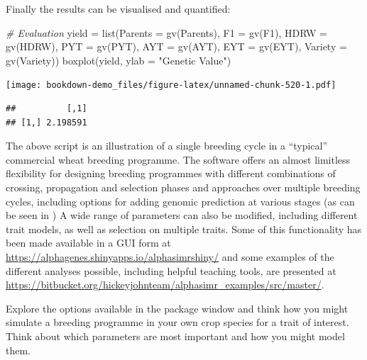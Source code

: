 \documentclass[
]{book}
\newenvironment{Shaded}{\begin{snugshade}}{\end{snugshade}}
\newcommand{\AttributeTok}[1]{\textcolor[rgb]{0.77,0.63,0.00}{#1}}
\newcommand{\CommentTok}[1]{\textcolor[rgb]{0.56,0.35,0.01}{\textit{#1}}}
\newcommand{\FunctionTok}[1]{\textcolor[rgb]{0.00,0.00,0.00}{#1}}
\newcommand{\NormalTok}[1]{#1}
\newcommand{\OtherTok}[1]{\textcolor[rgb]{0.56,0.35,0.01}{#1}}
\newcommand{\SpecialCharTok}[1]{\textcolor[rgb]{0.00,0.00,0.00}{#1}}
\newcommand{\StringTok}[1]{\textcolor[rgb]{0.31,0.60,0.02}{#1}}
\begin{document}
Finally the results can be visualised and quantified:

\begin{Shaded}
\begin{Highlighting}[]
\CommentTok{\# Evaluation}
\NormalTok{yield }\OtherTok{=} \FunctionTok{list}\NormalTok{(}\AttributeTok{Parents =} \FunctionTok{gv}\NormalTok{(Parents), }\AttributeTok{F1 =} \FunctionTok{gv}\NormalTok{(F1), }\AttributeTok{HDRW =} \FunctionTok{gv}\NormalTok{(HDRW), }
    \AttributeTok{PYT =} \FunctionTok{gv}\NormalTok{(PYT), }\AttributeTok{AYT =} \FunctionTok{gv}\NormalTok{(AYT), }\AttributeTok{EYT =} \FunctionTok{gv}\NormalTok{(EYT), }\AttributeTok{Variety =} \FunctionTok{gv}\NormalTok{(Variety))}
\FunctionTok{boxplot}\NormalTok{(yield, }\AttributeTok{ylab =} \StringTok{"Genetic Value"}\NormalTok{)}
\end{Highlighting}
\end{Shaded}

\texttt{[image: bookdown-demo\_files/figure-latex/unnamed-chunk-520-1.pdf]}

\begin{Shaded}
\end{Shaded}

\begin{verbatim}
##          [,1]
## [1,] 2.198591
\end{verbatim}

The above script is an illustration of a single breeding cycle in a ``typical'' commercial wheat breeding programme. The software offers an almost limitless flexibility for designing breeding programmes with different combinations of crossing, propagation and selection phases and approaches over multiple breeding cycles, including options for adding genomic prediction at various stages (as can be seen in \citet{Gaynor2017}) A wide range of parameters can also be modified, including different trait models, as well as selection on multiple traits. Some of this functionality has been made available in a GUI form at \url{https://alphagenes.shinyapps.io/alphasimrshiny/} and some examples of the different analyses possible, including helpful teaching tools, are presented at \url{https://bitbucket.org/hickeyjohnteam/alphasimr_examples/src/master/}.

Explore the options available in the package window and think how you might simulate a breeding programme in your own crop species for a trait of interest. Think about which parameters are most important and how you might model them.
\end{document}
